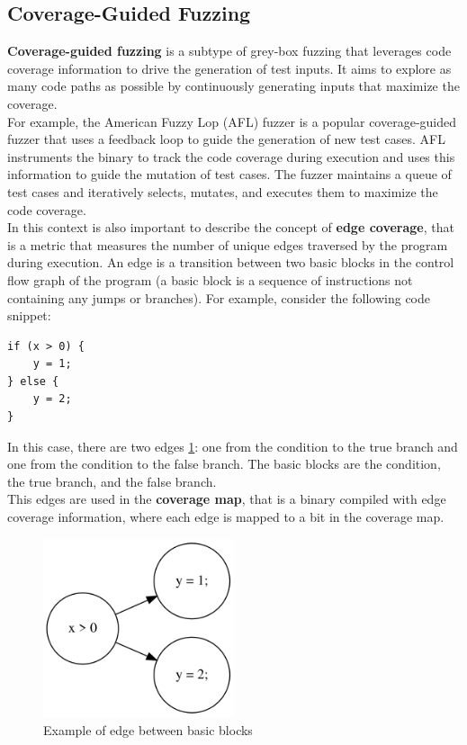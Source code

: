 \subsection{Coverage-Guided Fuzzing}
\textbf{Coverage-guided fuzzing} is a subtype of grey-box fuzzing that leverages code coverage information to drive the generation of test inputs. It aims to explore as many code paths as possible by continuously generating inputs that maximize the coverage.
\\For example, the American Fuzzy Lop (AFL) fuzzer is a popular coverage-guided fuzzer that uses a feedback loop to guide the generation of new test cases. AFL instruments the binary to track the code coverage during execution and uses this information to guide the mutation of test cases. The fuzzer maintains a queue of test cases and iteratively selects, mutates, and executes them to maximize the code coverage.
\\In this context is also important to describe the concept of \textbf{edge coverage}, that is a metric that measures the number of unique edges traversed by the program during execution. An edge is a transition between two basic blocks in the control flow graph of the program (a basic block is a sequence of instructions not containing any jumps or branches).
For example, consider the following code snippet:
\begin{lstlisting}
if (x > 0) {
    y = 1;
} else {
    y = 2;
}
\end{lstlisting}
In this case, there are two edges \ref{fig:sample_edge_graph}: one from the condition to the true branch and one from the condition to the false branch. The basic blocks are the condition, the true branch, and the false branch.
\\This edges are used in the \textbf{coverage map}, that is a binary compiled with edge coverage information, where each edge is mapped to a bit in the coverage map.
\begin{figure}[H]
    \centering
    \includegraphics[width=0.5\textwidth]{Images/sample_edge_graph.png}
    \caption{Example of edge between basic blocks}
    \label{fig:sample_edge_graph}
\end{figure}
